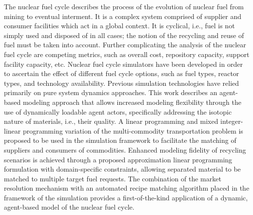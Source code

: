 The nuclear fuel cycle describes the process of the evolution of nuclear fuel
from mining to eventual interment. It is a complex system comprised of supplier
and consumer facilities which act in a global context. It is cyclical, i.e.,
fuel is not simply used and disposed of in all cases; the notion of the
recycling and reuse of fuel must be taken into account. Further complicating the
analysis of the nuclear fuel cycle are competing metrics, such as overall cost,
repository capacity, support facility capacity, etc. Nuclear fuel cycle
simulators have been developed in order to ascertain the effect of different
fuel cycle options, such as fuel types, reactor types, and technology
availability. Previous simulation technologies have relied primarily on pure
system dynamics approaches. This work describes an agent-based modeling approach
that allows increased modeling flexibility through the use of dynamically
loadable agent actors, specifically addressing the isotopic nature of materials,
i.e., their quality. A linear programming and mixed integer-linear programming
variation of the multi-commodity transportation problem is proposed to be used
in the simulation framework to facilitate the matching of suppliers and
consumers of commodities. Enhanced modeling fidelity of recycling scenarios is
achieved through a proposed approximation linear programming formulation with
domain-specific constraints, allowing separated material to be matched to
multiple target fuel requests. The combination of the market resolution
mechanism with an automated recipe matching algorithm placed in the framework of
the \Cyclus simulation provides a first-of-the-kind application of a dynamic,
agent-based model of the nuclear fuel cycle.